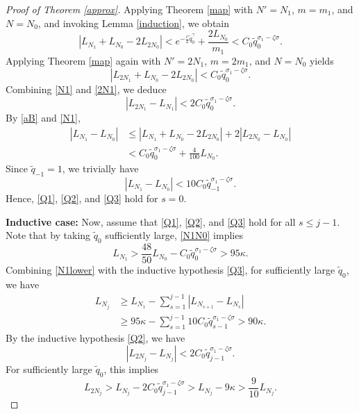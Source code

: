 \documentclass[reqno,12pt]{amsart}
\theoremstyle{plain}
\theoremstyle{definition}
\numberwithin{equation}{section}
\begin{document}
\begin{proof}[Proof of Theorem \ref{approx}]
Applying Theorem \ref{map} with $N'=N_{1}$, $m=m_{1}$, and $N=N_{0}$, and invoking Lemma \ref{induction}, we obtain
\begin{equation}\label{N1}
    |L_{N_{1}}+L_{N_{0}}-2L_{2N_{0}}|<e^{-\frac{c}{2}\tilde{q}_{0}^{\gamma}} + \frac{2L_{N_{0}}}{m_{1}}< C_{0}\tilde{q}_{0}^{\sigma_{1}-\zeta\sigma}.
\end{equation}
Applying Theorem \ref{map} again with $N'=2N_{1}$, $m=2m_{1}$, and $N=N_{0}$ yields
\begin{equation}\label{2N1}
    |L_{2N_{1}}+L_{N_{0}}-2L_{2N_{0}}|<C_{0}\tilde{q}_{0}^{\sigma_{1}-\zeta\sigma}.
\end{equation}
Combining \eqref{N1} and \eqref{2N1}, we deduce
\begin{equation*}
    |L_{2N_{1}}-L_{N_{1}}|<2C_{0}\tilde{q}_{0}^{\sigma_{1}-\zeta\sigma}.
\end{equation*}
By \eqref{aB} and \eqref{N1},
\begin{equation}\label{N1N0}
    \begin{split}
        |L_{N_{1}}-L_{N_{0}}|&\leqslant |L_{N_{1}}+L_{N_{0}}-2L_{2N_{0}}|+ 2|L_{2N_{0}}-L_{N_{0}}|\\
        &<  C_{0}\tilde{q}_{0}^{\sigma_{1}-\zeta\sigma} +\frac{4}{100} L_{N_{0}}.
    \end{split}
\end{equation}
Since $\tilde{q}_{-1}=1$, we trivially have
\begin{equation*}
    |L_{N_{1}}-L_{N_{0}}|<10 C_{0}\tilde{q}_{-1}^{\sigma_{1}-\zeta\sigma}.
\end{equation*}
Hence, \eqref{Q1}, \eqref{Q2}, and \eqref{Q3} hold for $s=0$.

{\bf Inductive case: } Now, assume that \eqref{Q1}, \eqref{Q2}, and \eqref{Q3} hold for all $s\leqslant j-1$.
Note that by taking $\tilde{q}_{0}$ sufficiently large, \eqref{N1N0} implies
\begin{equation}\label{N1lower}
    L_{N_{1}}>\frac{48}{50} L_{N_{0}}-C_{0}\tilde{q}_{0}^{\sigma_{1}-\zeta\sigma}>95\kappa.
\end{equation}
Combining \eqref{N1lower} with the inductive hypothesis \eqref{Q3}, for sufficiently large $\tilde{q}_0$, we have
\begin{equation*}
    \begin{split}
        L_{N_{j}}&\geqslant L_{N_{1}}-\sum_{s=1}^{j-1}|L_{N_{s+1}}-L_{N_{s}}|\\
        &\geqslant 95\kappa- \sum_{s=1}^{j-1} 10 C_{0}\tilde{q}_{s-1}^{\sigma_{1}-\zeta\sigma} > 90\kappa.
    \end{split}
\end{equation*}
By the inductive hypothesis \eqref{Q2}, we have 
\begin{equation*}
    |L_{2N_{j}}-L_{N_{j}}|< 2 C_{0}\tilde{q}_{j-1}^{\sigma_{1}-\zeta\sigma}.
\end{equation*}
For sufficiently large $\tilde{q}_0$, this implies 
\begin{equation*}
    L_{2N_{j}}> L_{N_{j}} -2 C_{0}\tilde{q}_{j-1}^{\sigma_{1}-\zeta\sigma}>L_{N_{j}} - 9\kappa> \frac{9}{10}L_{N_{j}}.
\end{equation*}


\end{proof}
\end{document}

